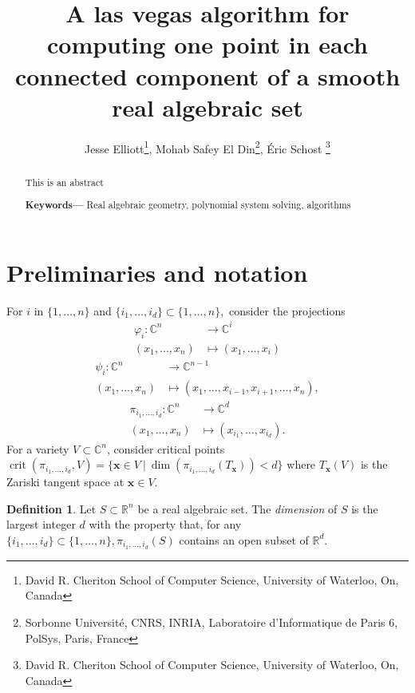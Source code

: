 \documentclass[10pt]{article}
\title{A las vegas algorithm for computing one point in each connected component of a smooth real algebraic set}
\author{Jesse Elliott\thanks{David R. Cheriton School of Computer Science, University of Waterloo, On, Canada}, Mohab Safey El Din\thanks{Sorbonne Universit\'e, CNRS, INRIA, Laboratoire d’Informatique de Paris 6, PolSys, Paris, France}, \'Eric Schost \thanks{David R. Cheriton School of Computer Science, University of Waterloo, On, Canada} 
}
\date{}
\theoremstyle{definition}
\newtheorem{definition}{Definition}
\newcommand{\C}{\mathbb{C}}
\newcommand{\R}{\mathbb{R}}
\newcommand{\vp}{\varphi}
\providecommand{\keywords}[1]
{
  \smallskip\noindent\small	
  \textbf{\textbf{Keywords---}} #1
}
\DeclareMathOperator{\crit}{crit}
\begin{document}
\maketitle




\begin{abstract}
This is an abstract \newline
\keywords{Real algebraic geometry, polynomial system solving, algorithms}
\end{abstract}



\section{Preliminaries and notation}
For $i$ in $\{1,\dots,n\}$ and $\{i_1,\hdots,i_d\} \subset \{1,\dots,n\},$ consider the projections
%
\begin{align*}
    \vp_i: \C^n  &\rightarrow \C^i \\
    (x_1,\hdots,x_n) &\mapsto  (x_1,\hdots,x_i)    
\end{align*}
%
%
\begin{align*}
    \psi_i: \C^n  &\rightarrow \C^{n-1} \\
    (x_1,\hdots,x_n) &\mapsto  (x_1,\hdots,x_{i-1},x_{i+1},\hdots,x_n),    
\end{align*}
%
\begin{align*}
    \pi_{i_1,\hdots,i_d}: \C^n  &\rightarrow \C^d \\
    (x_1,\hdots,x_n) &\mapsto  (x_{i_1},\hdots,x_{i_d}).    
\end{align*}
%
For a variety $V \subset \C^n$, consider critical points $\crit(\pi_{i_1,\hdots,i_d},V) = \big\{\bm x \in V~|~\dim \left(\pi_{i_1,\hdots,i_d}\left(T_{\bm x} \right) \right) < d \big\}$ where $T_{\bm x}(V)$ is the Zariski tangent space at $\bm x \in V$.
%
%
\begin{definition}
Let $S \subset \R^n$ be a real algebraic set. The \textit{dimension} of $S$ is the largest integer $d$ with the property that, for any $\{i_1,\hdots,i_d\} \subset \{1,\dots,n\}, \pi_{i_1,\hdots,i_d}(S)$ contains an open subset of $\R^d$.     
\end{definition}
%





\end{document}
